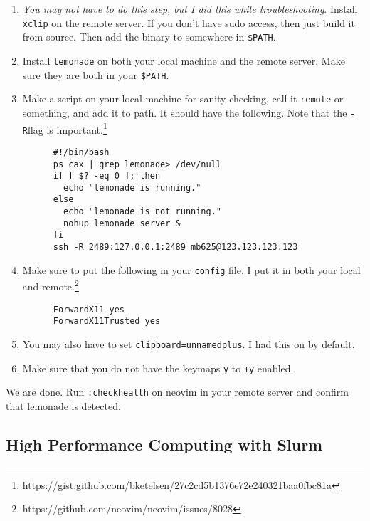   \begin{enumerate}
    \item \textit{You may not have to do this step, but I did this while troubleshooting}. Install \texttt{xclip} on the remote server. If you don't have sudo access, then just build it from source. Then add the binary to somewhere in \texttt{\$PATH}. 

    \item Install \texttt{lemonade} on both your local machine and the remote server. Make sure they are both in your \texttt{\$PATH}. 

    \item Make a script on your local machine for sanity checking, call it \texttt{remote} or something, and add it to path. It should have the following. Note that the \texttt{-R}flag is important.\footnote{https://gist.github.com/bketelsen/27c2cd5b1376e72e240321baa0fbc81a} 

    \begin{lstlisting}
      #!/bin/bash
      ps cax | grep lemonade> /dev/null
      if [ $? -eq 0 ]; then
        echo "lemonade is running."
      else
        echo "lemonade is not running."
        nohup lemonade server &
      fi
      ssh -R 2489:127.0.0.1:2489 mb625@123.123.123.123
    \end{lstlisting}

    \item Make sure to put the following in your \texttt{config} file. I put it in both your local and remote.\footnote{https://github.com/neovim/neovim/issues/8028} 

    \begin{lstlisting}
      ForwardX11 yes
      ForwardX11Trusted yes
    \end{lstlisting}

    \item You may also have to set \texttt{clipboard=unnamedplus}. I had this on by default. 

    \item Make sure that you do not have the keymaps \texttt{y} to \texttt{+y} enabled. 
  \end{enumerate}

  We are done. Run \texttt{:checkhealth} on neovim in your remote server and confirm that lemonade is detected. 

\subsection{High Performance Computing with Slurm}

